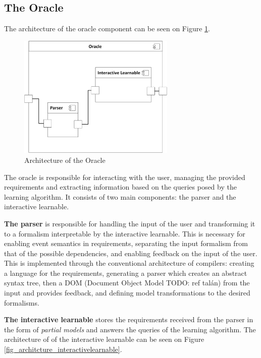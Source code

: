 \subsection{The Oracle} \label{subs_oracle}

The architecture of the oracle component can be seen on Figure \ref{fig_architcture_oracle}.

\begin{figure}[!ht] 
	\centering
		\includegraphics[width=75mm, keepaspectratio]{figures/architecture_oracle.png}
	\caption{Architecture of the Oracle} 
	\label{fig_architcture_oracle}
\end{figure}

The oracle is responsible for interacting with the user, managing the provided requirements and extracting information based on the queries posed by the learning algorithm. It consists of two main components: the parser and the interactive learnable.

\textbf{The parser} is responsible for handling the input of the user and transforming it to a formalism interpretable by the interactive learnable. This is necessary for enabling event semantics in requirements, separating the input formalism from that of the possible dependencies, and enabling feedback on the input of the user. This is implemented through the conventional architecture of compilers: creating a language for the requirements, generating a parser which creates an abstract syntax tree, then a DOM (Document Object Model TODO: ref talán) from the input and provides feedback, and defining model transformations to the desired formalisms.

\textbf{The interactive learnable} stores the requirements received from the parser in the form of \textit{partial models} and answers the queries of the learning algorithm. The architecture of of the interactive learnable can be seen on Figure \ref{fig_architcture_interactivelearnable}.

